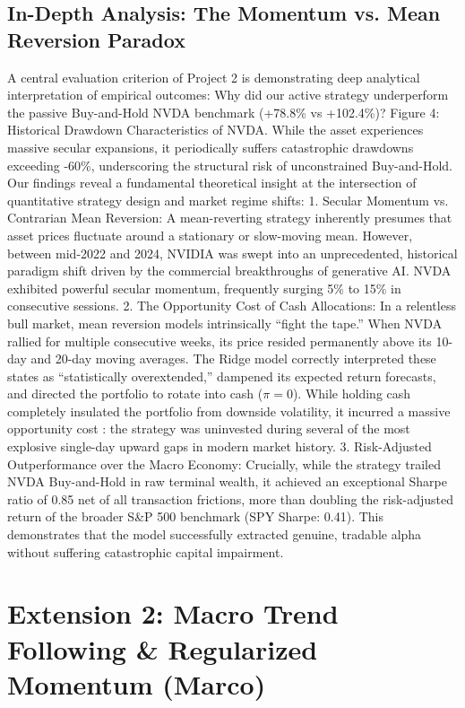 \documentclass[12pt, a4paper]{article}
\begin{document}
\subsection{In-Depth Analysis: The Momentum vs. Mean Reversion Paradox}
A central evaluation criterion of Project 2 is demonstrating deep analytical interpretation of empirical 
outcomes: Why did our active strategy underperform the passive Buy-and-Hold NVDA benchmark 
(+78.8\% vs +102.4\%)?
Figure 4: Historical Drawdown Characteristics of NVDA. While the asset experiences massive secular 
expansions, it periodically suffers catastrophic drawdowns exceeding -60\%, underscoring the structural 
risk of unconstrained Buy-and-Hold.
Our findings reveal a fundamental theoretical insight at the intersection of quantitative strategy design 
and market regime shifts:
1. Secular Momentum vs. Contrarian Mean Reversion:  A mean-reverting strategy inherently 
presumes that asset prices fluctuate around a stationary or slow-moving mean. However, between 
mid-2022 and 2024, NVIDIA was swept into an unprecedented, historical paradigm shift driven by 
the commercial breakthroughs of generative AI. NVDA exhibited powerful secular momentum, 
frequently surging 5\% to 15\% in consecutive sessions.
2. The Opportunity Cost of Cash Allocations:  In a relentless bull market, mean reversion models 
intrinsically ``fight the tape.'' When NVDA rallied for multiple consecutive weeks, its price resided 
permanently above its 10-day and 20-day moving averages. The Ridge model correctly interpreted 
these states as ``statistically overextended,'' dampened its expected return forecasts, and directed the 
portfolio to rotate into cash ($\pi = 0$). While holding cash completely insulated the portfolio from 
downside volatility, it incurred a massive opportunity cost : the strategy was uninvested during 
several of the most explosive single-day upward gaps in modern market history.
3. Risk-Adjusted Outperformance over the Macro Economy:  Crucially, while the strategy trailed 
NVDA Buy-and-Hold in raw terminal wealth, it achieved an exceptional Sharpe ratio of 0.85 net of all 
transaction frictions, more than doubling the risk-adjusted return of the broader S\&P 500 benchmark 
(SPY Sharpe: 0.41). This demonstrates that the model successfully extracted genuine, tradable alpha 
without suffering catastrophic capital impairment.

\section{Extension 2: Macro Trend Following \& Regularized Momentum (Marco)}
\end{document}
